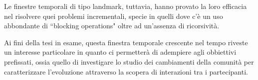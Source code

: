 Le finestre temporali di tipo landmark, tuttavia, hanno provato la loro efficacia nel risolvere quei problemi incrementali, specie in quelli dove c'{\`e} un uso abbondante di ``blocking operations" oltre ad un'assenza di ricorsivit{\`a}. 

Ai fini della tesi in esame, questa finestra temporale crescente nel tempo riveste un interesse particolare in quanto ci permetter{\`a} di adempiere agli obbiettivi prefissati, ossia quello di investigare lo studio dei cambiamenti della comunit{\`a} per caratterizzare l'evoluzione attraverso la scopera di interazioni tra i partecipanti.




